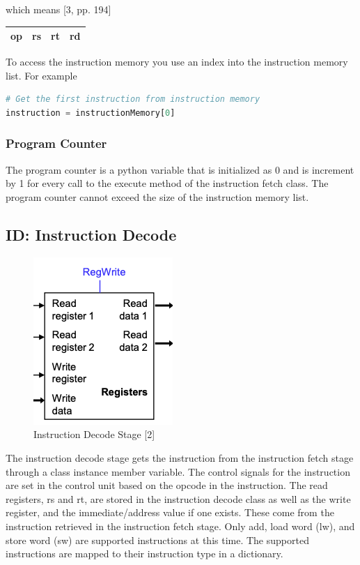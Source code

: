 \documentclass[conference]{IEEEtran}
\begin{document}
which means [3, pp. 194]

\begin{center}
\begin{tabular}{|c|c|c|c|}
\hline
     op & rs & rt & rd \\
\hline
\end{tabular}
\end{center}

To access the instruction memory you use an index into the instruction memory list.  For example
\begin{lstlisting}[language=Python]
# Get the first instruction from instruction memory
instruction = instructionMemory[0]
\end{lstlisting}

\subsubsection{Program Counter}

The program counter is a python variable that is initialized as 0 and is increment by 1 for every call to the execute method of the instruction fetch class.  The program counter cannot exceed the size of the instruction memory list.

\subsection{ID: Instruction Decode}

\begin{figure}
    \centering
    \includegraphics[scale=.4]{instructiondecode.png}
    \caption{Instruction Decode Stage [2]}
    \label{fig:instructiondecode}
\end{figure}

The instruction decode stage gets the instruction from the instruction fetch stage through a class instance member variable.  The control signals for the instruction are set in the control unit based on the opcode in the instruction.  The read registers, rs and rt, are stored in the instruction decode class as well as the write register, and the immediate/address value if one exists.  These come from the instruction retrieved in the instruction fetch stage.  Only add, load word (lw), and store word (sw) are supported instructions at this time.  The supported instructions are mapped to their instruction type in a dictionary.
\end{document}
